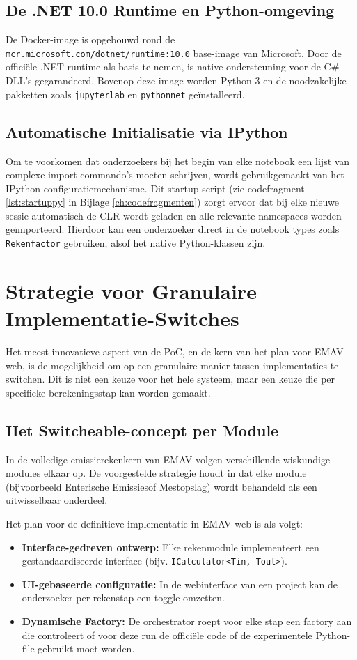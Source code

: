 \subsection{De .NET 10.0 Runtime en Python-omgeving}
De Docker-image is opgebouwd rond de \nolinkurl{mcr.microsoft.com/dotnet/runtime:10.0} base-image van Microsoft. Door de officiële .NET runtime als basis te nemen, is native ondersteuning voor de C\#-DLL's gegarandeerd. Bovenop deze image worden Python 3 en de noodzakelijke pakketten zoals \texttt{jupyterlab} en \texttt{pythonnet} geïnstalleerd.

\subsection{Automatische Initialisatie via IPython}
Om te voorkomen dat onderzoekers bij het begin van elke notebook een lijst van complexe import-commando's moeten schrijven, wordt gebruikgemaakt van het IPython-configuratiemechanisme. Dit startup-script (zie codefragment \ref{lst:startuppy} in Bijlage \ref{ch:codefragmenten}) zorgt ervoor dat bij elke nieuwe sessie automatisch de CLR wordt geladen en alle relevante namespaces worden geïmporteerd. Hierdoor kan een onderzoeker direct in de notebook types zoals \texttt{Rekenfactor} gebruiken, alsof het native Python-klassen zijn.

\section{Strategie voor Granulaire Implementatie-Switches}

Het meest innovatieve aspect van de PoC, en de kern van het plan voor EMAV-web, is de mogelijkheid om op een granulaire manier tussen implementaties te switchen. Dit is niet een keuze voor het hele systeem, maar een keuze die per specifieke berekeningsstap kan worden gemaakt.

\subsection{Het Switcheable-concept per Module}
In de volledige emissierekenkern van EMAV volgen verschillende wiskundige modules elkaar op. De voorgestelde strategie houdt in dat elke module (bijvoorbeeld \textquotedbl Enterische Emissies\textquotedbl \@ of \textquotedbl Mestopslag\textquotedbl ) wordt behandeld als een uitwisselbaar onderdeel.

Het plan voor de definitieve implementatie in EMAV-web is als volgt:
\begin{itemize}
    \item \textbf{Interface-gedreven ontwerp:} Elke rekenmodule implementeert een gestandaardiseerde interface (bijv. \texttt{ICalculator<Tin, Tout>}).
    \item \textbf{UI-gebaseerde configuratie:} In de webinterface van een project kan de onderzoeker per rekenstap een toggle omzetten.
    \item \textbf{Dynamische Factory:} De orchestrator roept voor elke stap een factory aan die controleert of voor deze run de officiële code of de experimentele Python-file gebruikt moet worden.
\end{itemize}

